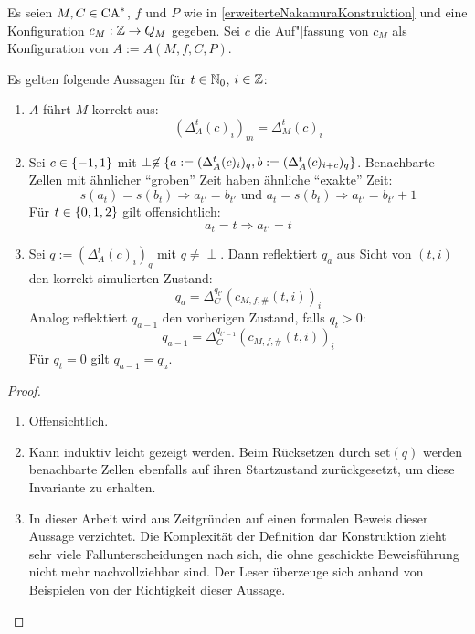 \begin{satz}
    Es seien $M, C \in \textrm{CA}^*$, $f$ und $P$ wie in \cref{erweiterteNakamuraKonstruktion} und eine Konfiguration $c_M: \mathbb{Z} \to Q_M$ gegeben.
    Sei $c$ die Auf"|fassung von $c_M$ als Konfiguration von $A := A(M, f, C, P)$.
    
    Es gelten folgende Aussagen für $t \in \mathbb{N}_0$, $i \in \mathbb{Z}$:
    
    \begin{enumerate}
        \item
            $A$ führt $M$ korrekt aus:
            \[
                (\Delta_A^t(c)_i)_m = \Delta_M^t(c)_i
            \]
        \item
            Sei $c \in \{ {-1, 1} \}$ mit $\perp \not \in \{ {a := (\Delta_A^t(c)_i)_q, b := (\Delta_A^t(c)_{i+c})_q} \}$.
            Benachbarte Zellen mit ähnlicher \enquote{groben} Zeit haben ähnliche \enquote{exakte} Zeit:
            \[
                s(a_{t}) = s(b_{t}) \Rightarrow a_{t'} = b_{t'} \text{ und }  a_{t} = s(b_{t}) \Rightarrow a_{t'} = b_{t'} + 1
            \]
            Für $t \in \{ {0, 1, 2} \}$ gilt offensichtlich:
            \[
                a_{t} = t \Rightarrow a_{t'} = t
            \]
        \item
            Sei $q := (\Delta_A^t(c)_i)_q$ mit $q \neq \perp$.
            Dann reflektiert $q_a$ aus Sicht von $(t, i)$ den korrekt simulierten Zustand:
            \[
                q_a = \Delta_C^{q_{t'}}(c_{M, f, \#}(t, i))_i
            \]
            Analog reflektiert $q_{a-1}$ den vorherigen Zustand, falls $q_t > 0$:
            \[
                q_{a-1} = \Delta_C^{q_{t' - 1}}(c_{M, f, \#}(t, i))_i
            \]
            Für $q_t = 0$ gilt $q_{a-1} = q_a$.
    \end{enumerate}
\end{satz}
\begin{proof}
    \begin{enumerate}
        \item Offensichtlich.
        \item Kann induktiv leicht gezeigt werden.
            Beim Rücksetzen durch $\mathrm{set}(q)$ werden benachbarte Zellen ebenfalls auf ihren Startzustand zurückgesetzt, um diese Invariante zu erhalten.
        \item
            In dieser Arbeit wird aus Zeitgründen auf einen formalen Beweis dieser Aussage verzichtet.
            Die Komplexität der Definition dar Konstruktion zieht sehr viele Fallunterscheidungen nach sich,
            die ohne geschickte Beweisführung nicht mehr nachvollziehbar sind.
            Der Leser überzeuge sich anhand von Beispielen von der Richtigkeit dieser Aussage.
    \end{enumerate}
\end{proof}

